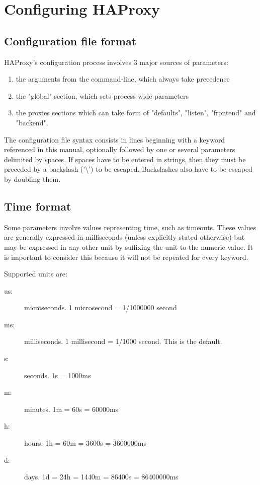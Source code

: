 \chapter{Configuring HAProxy}
\section{Configuration file format}
HAProxy's configuration process involves 3 major sources of parameters:
\begin{enumerate}
\item the arguments from the command-line, which always take precedence
\item the "global" section, which sets process-wide parameters
\item the proxies sections which can take form of "defaults", "listen",
    "frontend" and "backend".
\end{enumerate}

The configuration file syntax consists in lines beginning with a keyword
referenced in this manual, optionally followed by one or several parameters
delimited by spaces. If spaces have to be entered in strings, then they must be
preceded by a backslash ('\textbackslash') to be escaped. Backslashes also have to be
escaped by doubling them.

\section{Time format}
Some parameters involve values representing time, such as timeouts. These
values are generally expressed in milliseconds (unless explicitly stated
otherwise) but may be expressed in any other unit by suffixing the unit to the
numeric value. It is important to consider this because it will not be repeated
for every keyword.

\vspace{5mm}
Supported units are:
\begin{description}
\item[us:] microseconds. 1 microsecond = 1/1000000 second
\item[ms:] milliseconds. 1 millisecond = 1/1000 second. This is the default.
\item[s:]  seconds. 1s = 1000ms
\item[m:]  minutes. 1m = 60s = 60000ms
\item[h:]  hours.   1h = 60m = 3600s = 3600000ms
\item[d:]  days.    1d = 24h = 1440m = 86400s = 86400000ms
\end{description}

